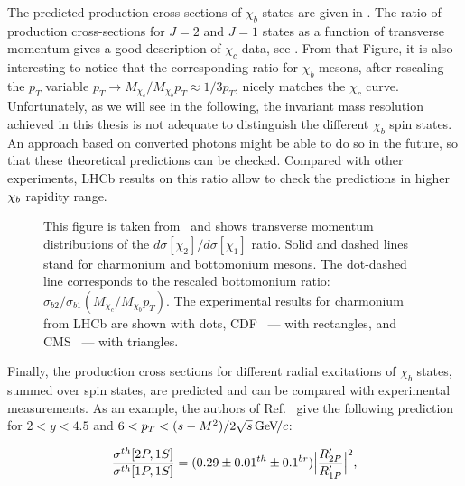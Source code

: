 The predicted production cross sections of $\chi_b$ states are given in
. The ratio of production cross-sections for $J=2$ and
$J=1$ states as a function of transverse momentum gives a good description of
$\chi_c$ data, see . From that Figure, it is also
interesting to notice that the corresponding ratio for $\chi_b$ mesons, after
rescaling the $p_T$ variable $p_T \rightarrow M_{\chi_c} / M_{\chi_b} p_T
\approx 1/3 p_T$, nicely matches the $\chi_c$ curve. Unfortunately, as we will
see in the following, the invariant mass resolution achieved in this thesis is
not adequate to distinguish the different $\chi_b$ spin states. An approach
based on converted photons might be able to do so in the future, so that these
theoretical predictions can be checked. Compared with other experiments, LHCb
results on this ratio allow to check the predictions in higher $\chi_{{b}}$ rapidity
range.

\begin{figure}[ht]
  \setlength{\unitlength}{1mm}
  \centering
  \caption {\small This figure is taken from~\cite{Likhoded:2012hw} and shows
  transverse momentum distributions of the
$d\sigma\left[\chi_{2}\right]/d\sigma[\chi_{1}]$ ratio. Solid and dashed lines
stand for charmonium and bottomonium mesons. The dot-dashed line corresponds to
the rescaled bottomonium ratio:
$\sigma_{b2}/\sigma_{b1}(M_{\chi_c}/M_{\chi_b}p_T)$. The experimental results
for charmonium from LHCb\cite{LHCb-PAPER-2013-028} are shown with dots,
CDF~\cite{Abulencia:2007bra} --- with rectangles, and CMS~\cite{Chatrchyan:2012ub}
--- with triangles.}
  \label{fig:frac:ratio}
\end{figure}




Finally, the production cross sections for different radial excitations of $\chi_b$ states, summed over spin states, 
are predicted and can be compared with experimental measurements. As an example, the authors of Ref.~\cite{Likhoded:2012hw} give
the following prediction for $2 < y  < 4.5$ and $6 < p_T < (s-M^2)/2\sqrt{s} {\mathrm{\,Ge\kern -0.1em V\!/}c}$:

\begin{equation}
\frac{\sigma^{th}[2P,1S]}{\sigma^{th}[1P,1S]} = (0.29 \pm 0.01^{th} \pm 0.1^{br}) \Bigl| \frac{R'_{2P}}{R'_{1P}}\Bigr|^2, 
\end{equation}

